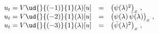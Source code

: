 \begin{equation}\label{eq:negKdV}
\begin{array}{rcl}
u_t =     {V}\ud{}{(-1)}{1}(\lambda)[u] & = & \left({\psi(\lambda)^2}\right)_x \,,\\
u_t =     {V}\ud{}{(-2)}{1}(\lambda)[u]& = & \left(\psi(\lambda)\,\bar{\psi}(\lambda)\right)_x \,,\\
u_t ={V}\ud{}{(-3)}{1}(\lambda)[u] & =
&\left(\bar{\psi}(\lambda)^2\right)_x\,, \
\end{array}
\end{equation}

